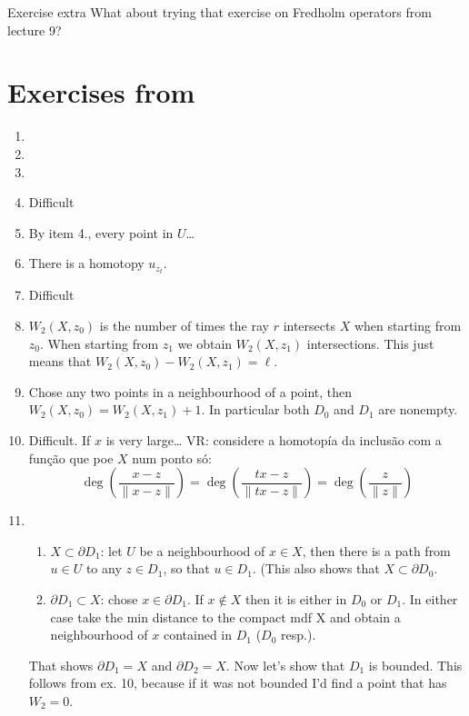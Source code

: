 \begin{thing4}{Exercise extra}\label{exer:extra}\leavevmode
What about trying that exercise on Fredholm operators from lecture 9?
\end{thing4}

\section{Exercises from \cite{gui}}


\begin{enumerate}
	\item 
	\item 
	\item 
	\item Difficult
	\item By item 4., every point in \(U\)…
	\item There is a homotopy \(u_{z_t}\).
	\item Difficult
	\item \(W_2(X,z_0)\) is the number of times the ray \(r\) intersects \(X\) when starting from \(z_0\). When starting from \(z_1\) we obtain \(W_2(X,z_1)\) intersections. This just means that \(W_2(X,z_0)-W_2(X,z_1)=\ell\).
	\item Chose any two points in a neighbourhood of a point, then \(W_2(X,z_0)=W_2(X,z_1)+1\). In particular both \(D_0\) and \(D_1\) are nonempty.
	\item Difficult. If \(x\) is very large… VR: considere a homotopía da inclusão com a função que poe \(X\) num ponto só:
		\[\operatorname{deg}\left(\frac{x-z}{\|x-z\|}\right) =\operatorname{deg}\left(\frac{t x -z}{\|t x -z\|}\right) =\operatorname{deg}\left(\frac{z}{\|z\|}\right) \]
		
	\item 
		\begin{enumerate}
		\item \(X \subset \partial D_1\): let \(U\) be a neighbourhood of \(x \in X\), then there is a path from \(u \in U\) to any \(z \in D_1\), so that \(u \in D_1\). (This also shows that \( X \subset \partial D_0\).
		\item \(\partial D_1 \subset X\): chose \(x \in \partial D_1\). If \(x \not \in X\) then it is either in \(D_0\) or \(D_1\). In either case take the min distance to the compact mdf X and obtain a neighbourhood of \(x\) contained in \(D_1\) (\(D_0\) resp.).
		\end{enumerate}
		That shows \(\partial D_1=X\) and \(\partial D_2=X\). Now let's show that \(D_1\) is bounded. This follows from ex. 10, because if it was not bounded I'd find a point that has \(W_2=0\).
\end{enumerate}


